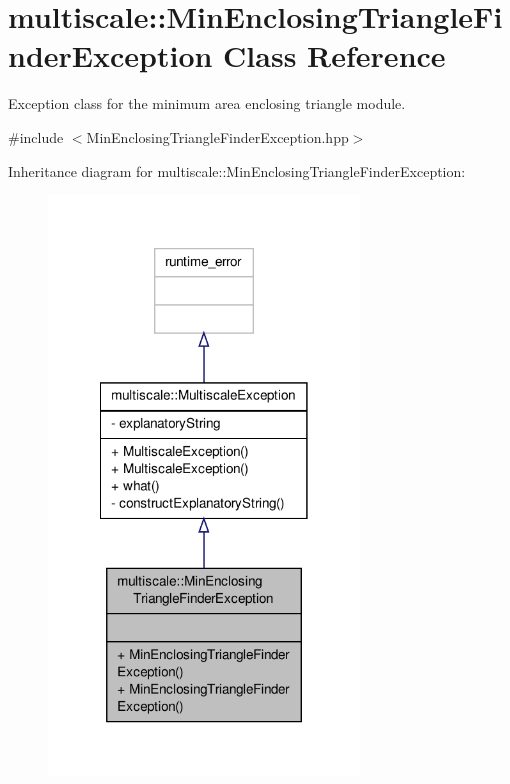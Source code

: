 \hypertarget{classmultiscale_1_1MinEnclosingTriangleFinderException}{\section{multiscale\-:\-:Min\-Enclosing\-Triangle\-Finder\-Exception Class Reference}
\label{classmultiscale_1_1MinEnclosingTriangleFinderException}
}


Exception class for the minimum area enclosing triangle module.  




{\ttfamily \#include $<$Min\-Enclosing\-Triangle\-Finder\-Exception.\-hpp$>$}



Inheritance diagram for multiscale\-:\-:Min\-Enclosing\-Triangle\-Finder\-Exception\-:\nopagebreak
\begin{figure}[H]
\begin{center}
\leavevmode
\includegraphics[width=234pt]{classmultiscale_1_1MinEnclosingTriangleFinderException__inherit__graph}
\end{center}
\end{figure}


